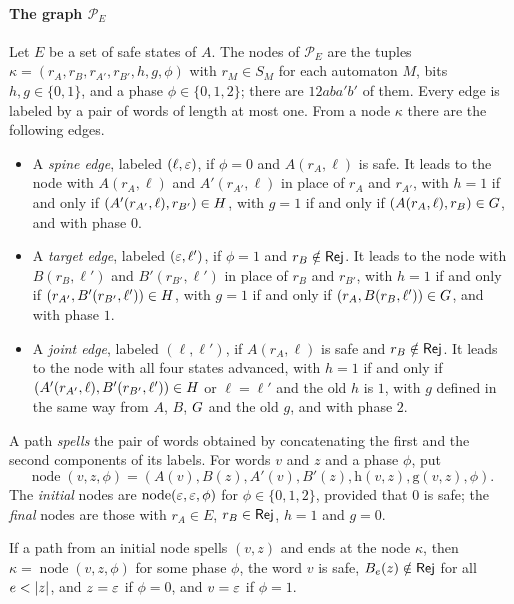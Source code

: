 \paragraph{The graph $\mathcal P_E$}
Let $E$ be a set of safe states of $A$. The nodes of $\mathcal P_E$ are the
tuples $\kappa=(r_A,r_B,r_{A'},r_{B'},h,g,\phi)$ with $r_M\in S_M$ for each
automaton $M$, bits $h,g\in\{0,1\}$, and a phase $\phi\in\{0,1,2\}$; there are
$12aba'b'$ of them. Every edge is labeled by a pair of words of length at most
one. From a node $\kappa$ there are the following edges.
\begin{itemize}[leftmargin=*]
\item A \emph{spine edge}, labeled $(\ell,\varepsilon)$, if $\phi=0$ and
  $A(r_A,\ell)$ is safe. It leads to the node with $A(r_A,\ell)$ and
  $A'(r_{A'},\ell)$ in place of $r_A$ and $r_{A'}$, with $h=1$ if and only if
  $(A'(r_{A'},\ell),r_{B'})\in H$, with $g=1$ if and only if
  $(A(r_A,\ell),r_B)\in G$, and with phase $0$.
\item A \emph{target edge}, labeled $(\varepsilon,\ell')$, if $\phi=1$ and
  $r_B\notin\mathsf{Rej}$. It leads to the node with $B(r_B,\ell')$ and
  $B'(r_{B'},\ell')$ in place of $r_B$ and $r_{B'}$, with $h=1$ if and only if
  $(r_{A'},B'(r_{B'},\ell'))\in H$, with $g=1$ if and only if
  $(r_A,B(r_B,\ell'))\in G$, and with phase $1$.
\item A \emph{joint edge}, labeled $(\ell,\ell')$, if $A(r_A,\ell)$ is safe and
  $r_B\notin\mathsf{Rej}$. It leads to the node with all four states advanced, with
  $h=1$ if and only if $(A'(r_{A'},\ell),B'(r_{B'},\ell'))\in H$ or
  $\ell=\ell'$ and the old $h$ is $1$, with $g$ defined in the same way from
  $A$, $B$, $G$ and the old $g$, and with phase $2$.
\end{itemize}
A path \emph{spells} the pair of words obtained by concatenating the first and
the second components of its labels. For words $v$ and $z$ and a phase $\phi$,
put
\[
 \operatorname{node}(v,z,\phi)
 =(A(v),B(z),A'(v),B'(z),\mathrm h(v,z),\mathrm g(v,z),\phi).
\]
The \emph{initial} nodes are $\operatorname{node}(\varepsilon,\varepsilon,\phi)$ for
$\phi\in\{0,1,2\}$, provided that $0$ is safe; the \emph{final} nodes are
those with $r_A\in E$, $r_B\in\mathsf{Rej}$, $h=1$ and $g=0$.

\begin{lemma}[Invariant]\label{lem:nm-graph-invariant}
If a path from an initial node spells $(v,z)$ and ends at the node $\kappa$,
then $\kappa=\operatorname{node}(v,z,\phi)$ for some phase $\phi$, the word $v$ is safe,
$B_e(z)\notin\mathsf{Rej}$ for all $e<\lvert z\rvert$, and $z=\varepsilon$ if $\phi=0$, and $v=\varepsilon$ if
$\phi=1$.
\end{lemma}

